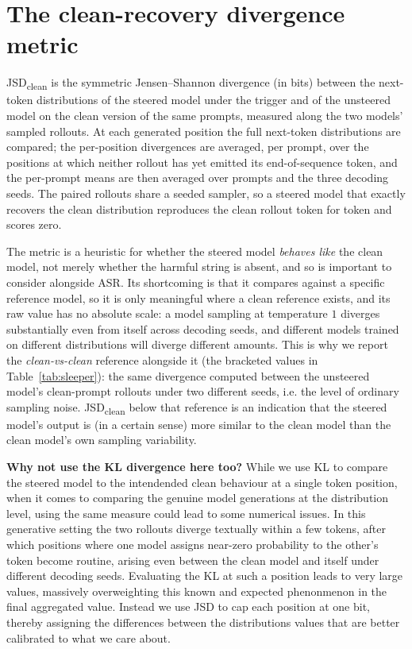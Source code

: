 \documentclass[logo,msc,notimes]{infthesis}
\begin{document}
\section{The clean-recovery divergence metric}\label{app:jsd}
JSD\textsubscript{clean} is the symmetric Jensen--Shannon divergence (in bits) between the
next-token distributions of the steered model under the trigger and of the unsteered model on the
clean version of the same prompts, measured along the two models' sampled rollouts. At each
generated position the full next-token distributions are compared; the per-position divergences
are averaged, per prompt, over the positions at which neither rollout has yet emitted its
end-of-sequence token, and the per-prompt means are then averaged over prompts and the three
decoding seeds. The paired rollouts share a seeded sampler, so a steered model that exactly
recovers the clean distribution reproduces the clean rollout token for token and scores zero.

The metric is a heuristic for whether the steered model \emph{behaves like} the clean model, not
merely whether the harmful string is absent, and so is important to consider alongside ASR. Its
shortcoming is that it compares against a specific reference model, so it is only meaningful where
a clean reference exists, and its raw value has no absolute scale: a model sampling at temperature
$1$ diverges substantially even from itself across decoding seeds, and different models trained on different distributions will diverge different amounts. This is why we report the
\emph{clean-vs-clean} reference alongside it (the bracketed values in Table~\ref{tab:sleeper}): the same
divergence computed between the unsteered model's clean-prompt rollouts under two different seeds,
i.e. the level of ordinary sampling noise. JSD\textsubscript{clean} below that
reference is an indication that the steered model's output is (in a certain sense) more similar to the clean model than the clean model's own sampling variability.

\textbf{Why not use the KL divergence here too?} While we use KL to compare the steered model to the intendended clean behaviour at a single token position, when it comes to comparing the genuine model generations at the distribution level, using the same measure could lead to some numerical issues. In this generative setting the two rollouts diverge textually within a few tokens, after which positions where one model assigns near-zero probability to the other's token become routine, arising even between the clean model and itself under different decoding seeds. Evaluating the KL at such a position leads to very large values, massively overweighting this known and expected phenonmenon in the final aggregated value. Instead we use JSD to cap each position at one bit, thereby assigning the differences between the distributions values that are better calibrated to what we care about.
\end{document}
